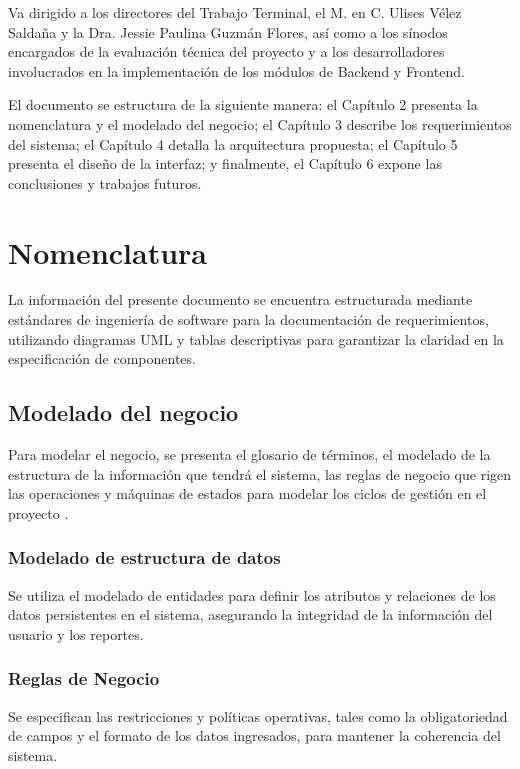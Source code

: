     Va dirigido a los directores del Trabajo Terminal, el M. en C. Ulises Vélez Saldaña y la Dra. Jessie Paulina Guzmán Flores, así como a los sínodos encargados de la evaluación técnica del proyecto y a los desarrolladores involucrados en la implementación de los módulos de Backend y Frontend.
    
    El documento se estructura de la siguiente manera: el Capítulo 2 presenta la nomenclatura y el modelado del negocio; el Capítulo 3 describe los requerimientos del sistema; el Capítulo 4 detalla la arquitectura propuesta; el Capítulo 5 presenta el diseño de la interfaz; y finalmente, el Capítulo 6 expone las conclusiones y trabajos futuros.

\chapter{Nomenclatura}
\label{ch:nomenclatura}
    
    La información del presente documento se encuentra estructurada mediante estándares de ingeniería de software para la documentación de requerimientos, utilizando diagramas UML y tablas descriptivas para garantizar la claridad en la especificación de componentes.

    \section{Modelado del negocio}
    
        Para modelar el negocio, se presenta el glosario de términos, el modelado de la estructura de la información que tendrá el sistema, las reglas de negocio que rigen las operaciones y máquinas de estados para modelar los ciclos de gestión en el proyecto \varProyecto.

        \subsection{Modelado de estructura de datos}
        \label{sec:ModEstructuraDatos}
        Se utiliza el modelado de entidades para definir los atributos y relaciones de los datos persistentes en el sistema, asegurando la integridad de la información del usuario y los reportes.
        
        \subsection{Reglas de Negocio}
        \label{sec:ModReglasNegocio}
        Se especifican las restricciones y políticas operativas, tales como la obligatoriedad de campos y el formato de los datos ingresados, para mantener la coherencia del sistema.
        
